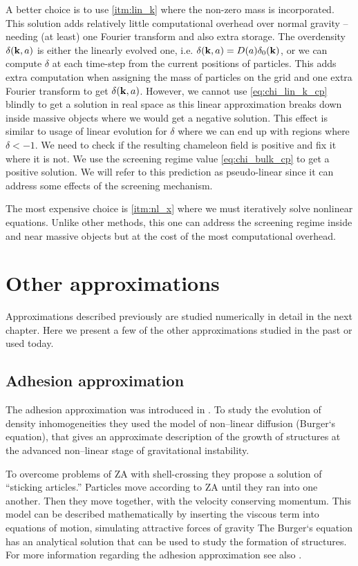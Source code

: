 A better choice is to use \ref{itm:lin_k} where the non-zero mass is incorporated. This solution adds relatively little computational overhead over normal gravity -- needing (at least) one Fourier transform and also extra storage. The overdensity $\delta(\mathbf k, a)$ is either the linearly evolved one, i.e. $\delta(\mathbf k, a) = D(a)\delta_0(\mathbf k)$, or we can compute $\delta$ at each time-step from the current positions of particles. This adds extra computation when assigning the mass of particles on the grid and one extra Fourier transform to get $\delta(\mathbf k, a)$. 
However, we cannot use \eqref{eq:chi_lin_k_cp} blindly to get a solution in real space as this linear approximation breaks down inside massive objects where we would get a negative solution. This effect is similar to usage of linear evolution for $\delta$ where we can end up with regions where $\delta<-1$. We need to check if the resulting chameleon field is positive and fix it where it is not. We use the screening regime value \eqref{eq:chi_bulk_cp} to get a positive solution. We will refer to this prediction as pseudo-linear since it can address some effects of the screening mechanism.

The most expensive choice is \ref{itm:nl_x} where we must iteratively solve nonlinear equations. Unlike other methods, this one can address the screening regime inside and near massive objects but at the cost of the most computational overhead.

\section{Other approximations}
Approximations described previously are studied numerically in detail in the next chapter. Here we present a few of the other approximations studied in the past or used today.

\subsection{Adhesion approximation}
The adhesion approximation was introduced in \textcite{1989MNRAS.236..385G}. To study the evolution of density inhomogeneities they used the model of non--linear diffusion (Burger`s equation), that gives an approximate description of the growth of structures at the advanced non--linear stage of gravitational instability.

To overcome problems of ZA with shell-crossing they propose a solution of ``sticking articles.'' Particles move according to ZA until they ran into one another. Then they move together, with the velocity conserving momentum. This model can be described mathematically by inserting the viscous term into equations of motion, simulating attractive forces of gravity
The Burger`s equation has an analytical solution that can be used to study the formation of structures. For more information regarding the adhesion approximation see  also \textcite{1990MNRAS.247..260W,1994ApJ...428...28M}.

